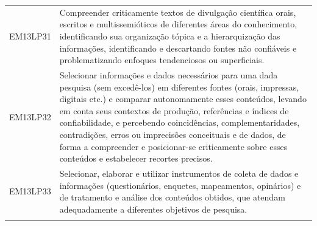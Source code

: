 \documentclass[12pt]{extarticle}
\begin{document}
\begin{longtable}{ll}
EM13LP31   & Compreender criticamente textos de divulgação científica orais, escritos e multissemióticos de diferentes áreas do conhecimento, identificando sua organização tópica e a hierarquização das informações, identificando e descartando fontes não confiáveis e problematizando enfoques tendenciosos ou superficiais.                                                                                                                                                                                                                                                                                                                                                                                                                                                                                                  \\
\rowcolor[HTML]{FFF} 
EM13LP32   & Selecionar informações e dados necessários para uma dada pesquisa (sem excedê-los) em diferentes fontes (orais, impressas, digitais etc.) e comparar autonomamente esses conteúdos, levando em conta seus contextos de produção, referências e índices de confiabilidade, e percebendo coincidências, complementaridades, contradições, erros ou imprecisões conceituais e de dados, de forma a compreender e posicionar-se criticamente sobre esses conteúdos e estabelecer recortes precisos.                                                                                                                                                                                                                                                                                                                       \\
\rowcolor[HTML]{E0F7FA} 
EM13LP33   & Selecionar, elaborar e utilizar instrumentos de coleta de dados e informações (questionários, enquetes, mapeamentos, opinários) e de tratamento e análise dos conteúdos obtidos, que atendam adequadamente a diferentes objetivos de pesquisa.                                                                                                                                                                                                                                                                                                                                                                                                                                                                                                                                                                        \\
\rowcolor[HTML]{FFF} 

\end{longtable}
\end{document}
